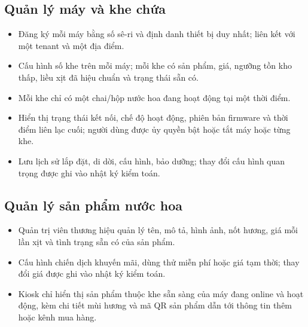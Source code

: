 \subsection{Quản lý máy và khe chứa}
\begin{itemize}
  \item Đăng ký mỗi máy bằng số sê-ri và định danh thiết bị duy nhất; liên kết với một tenant và một địa điểm.
  \item Cấu hình số khe trên mỗi máy; mỗi khe có sản phẩm, giá, ngưỡng tồn kho thấp, liều xịt đã hiệu chuẩn và trạng thái sẵn có.
  \item Mỗi khe chỉ có một chai/hộp nước hoa đang hoạt động tại một thời điểm.
  \item Hiển thị trạng thái kết nối, chế độ hoạt động, phiên bản firmware và thời điểm liên lạc cuối; người dùng được ủy quyền bật hoặc tắt máy hoặc từng khe.
  \item Lưu lịch sử lắp đặt, di dời, cấu hình, bảo dưỡng; thay đổi cấu hình quan trọng được ghi vào nhật ký kiểm toán.
\end{itemize}
\subsection{Quản lý sản phẩm nước hoa}
\begin{itemize}
  \item Quản trị viên thương hiệu quản lý tên, mô tả, hình ảnh, nốt hương, giá mỗi lần xịt và tình trạng sẵn có của sản phẩm.
  \item Cấu hình chiến dịch khuyến mãi, dùng thử miễn phí hoặc giá tạm thời; thay đổi giá được ghi vào nhật ký kiểm toán.
  \item Kiosk chỉ hiển thị sản phẩm thuộc khe sẵn sàng của máy đang online và hoạt động, kèm chi tiết mùi hương và mã QR sản phẩm dẫn tới thông tin thêm hoặc kênh mua hàng.
\end{itemize}
